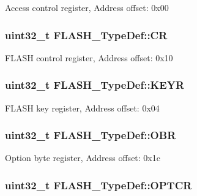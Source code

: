 Access control register, Address offset\-: 0x00 \hypertarget{struct_f_l_a_s_h___type_def_a7919306d0e032a855200420a57f884d7}{
\subsubsection[{C\-R}]{ uint32\-\_\-t F\-L\-A\-S\-H\-\_\-\-Type\-Def\-::\-C\-R}}\label{struct_f_l_a_s_h___type_def_a7919306d0e032a855200420a57f884d7}
F\-L\-A\-S\-H control register, Address offset\-: 0x10 \hypertarget{struct_f_l_a_s_h___type_def_a802e9a26a89b44decd2d32d97f729dd3}{
\subsubsection[{K\-E\-Y\-R}]{ uint32\-\_\-t F\-L\-A\-S\-H\-\_\-\-Type\-Def\-::\-K\-E\-Y\-R}}\label{struct_f_l_a_s_h___type_def_a802e9a26a89b44decd2d32d97f729dd3}
F\-L\-A\-S\-H key register, Address offset\-: 0x04 \hypertarget{struct_f_l_a_s_h___type_def_a24dece1e3b3185456afe34c3dc6add2e}{
\subsubsection[{O\-B\-R}]{ uint32\-\_\-t F\-L\-A\-S\-H\-\_\-\-Type\-Def\-::\-O\-B\-R}}\label{struct_f_l_a_s_h___type_def_a24dece1e3b3185456afe34c3dc6add2e}
Option byte register, Address offset\-: 0x1c \hypertarget{struct_f_l_a_s_h___type_def_a54026c3b5bc2059f1b187acb6c4817ac}{
\subsubsection[{O\-P\-T\-C\-R}]{ uint32\-\_\-t F\-L\-A\-S\-H\-\_\-\-Type\-Def\-::\-O\-P\-T\-C\-R}}\label{struct_f_l_a_s_h___type_def_a54026c3b5bc2059f1b187acb6c4817ac}
